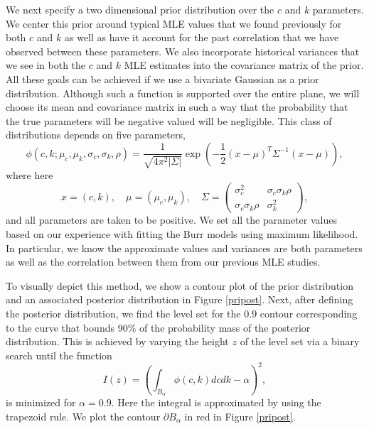\documentclass{amsart}
\begin{document}
We next specify a two dimensional prior distribution over the $c$ and $k$ 
parameters.  We center this prior around typical MLE values that we found 
previously for both $c$ and $k$ as well as have it account for the past correlation that
we have observed between these parameters.  We also incorporate 
historical variances that we see in both the $c$ and $k$ MLE estimates 
into the covariance matrix of the prior. All these goals can be achieved if we use a bivariate Gaussian 
as a prior distribution.  Although such a function is supported over the entire plane, 
we will choose its mean and covariance matrix in such a way that the probability that the 
true parameters will be negative valued will be negligible. 
This class of distributions depends on five parameters, 
%
\begin{equation}
    \phi(c,k; \mu_c,\mu_k,\sigma_c,\sigma_k,\rho) 
    =\frac{1}{\sqrt{4\pi^2|\Sigma|}}\exp\left(-\frac{1}{2} (x-\mu)^T\Sigma^{-1}(x-\mu)\right),
\end{equation}
where here 
\begin{equation}
         x =(c,k), \quad \mu = (\mu_c,\mu_k), \quad
        \Sigma = \left(\begin{array}{cc}
                \sigma_c^2 & \sigma_c\sigma_k\rho \\ 
                \sigma_c\sigma_k\rho & \sigma_k^2
        \end{array}\right), 
\end{equation}
%
and all parameters are taken to be positive. We set all the 
parameter values based on our experience with fitting the 
Burr models using maximum likelihood.  In particular, we know the 
approximate values and variances are both parameters as well as 
the correlation between them from our previous MLE studies.

To visually depict this method, we show a contour plot of the 
prior distribution and an associated posterior 
distribution in Figure \ref{pripost}. Next, after defining the posterior distribution, 
we find the level set for the $0.9$ contour corresponding to the 
curve that bounds 90\% of the probability mass of the posterior distribution. This is achieved by 
varying the height $z$ of the level set via a binary search until the function 
%
\begin{equation}
    I(z) = \left(\int_{B_\alpha}\phi(c,k)dcdk-\alpha \right)^2,
\end{equation}
%
is minimized for $\alpha = 0.9$.  Here the integral is approximated by using the trapezoid 
rule.  We plot the contour $\partial B_\alpha$ in red in Figure \ref{pripost}. 
\end{document}
